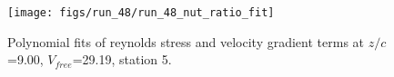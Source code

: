 \begin{figure}[H]
\centering
\texttt{[image: figs/run\_48/run\_48\_nut\_ratio\_fit]}
\caption{Polynomial fits of reynolds stress and velocity gradient terms at $z/c$=9.00, $V_{free}$=29.19, station 5.}
\label{fig:run_48_nut_ratio_fit}
\end{figure}


